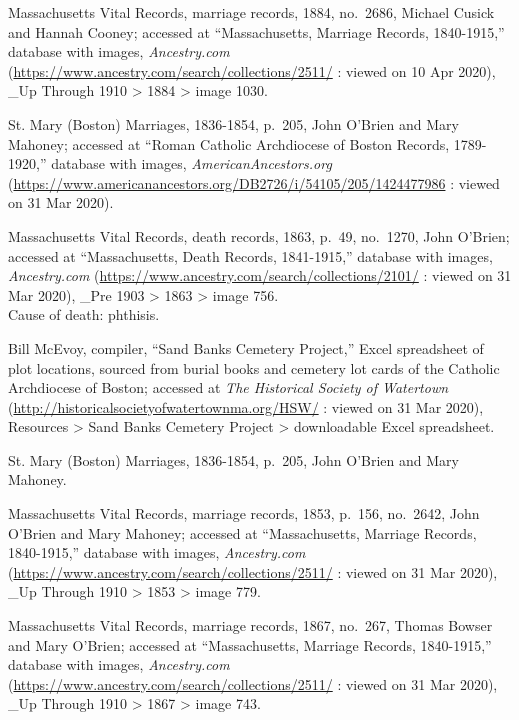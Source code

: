 \begin{thebibliography}{999}
Massachusetts Vital Records, marriage records, 1884, no.\ 2686, Michael Cusick and Hannah Cooney; accessed at ``Massachusetts, Marriage Records, 1840-1915,'' database with images, \textit{Ancestry.com} (\url{https://www.ancestry.com/search/collections/2511/} : viewed on 10 Apr 2020), \_Up Through 1910 > 1884 > image 1030.


St. Mary (Boston) Marriages, 1836-1854, p.\ 205, John O'Brien and Mary Mahoney; accessed at ``Roman Catholic Archdiocese of Boston Records, 1789-1920,'' database with images, \textit{AmericanAncestors.org} (\url{https://www.americanancestors.org/DB2726/i/54105/205/1424477986} : viewed on 31 Mar 2020).

Massachusetts Vital Records, death records, 1863, p.\ 49, no.\ 1270, John O'Brien; accessed at ``Massachusetts, Death Records, 1841-1915,'' database with images, \textit{Ancestry.com} (\url{https://www.ancestry.com/search/collections/2101/} : viewed on 31 Mar 2020), \_Pre 1903 > 1863 > image 756.\\
Cause of death: phthisis.

Bill McEvoy, compiler, ``Sand Banks Cemetery Project,'' Excel spreadsheet of plot locations, sourced from burial books and cemetery lot cards of the Catholic Archdiocese of Boston; accessed at \textit{The Historical Society of Watertown} (\url{http://historicalsocietyofwatertownma.org/HSW/} : viewed on 31 Mar 2020), Resources > Sand Banks Cemetery Project > downloadable Excel spreadsheet.

St. Mary (Boston) Marriages, 1836-1854, p.\ 205, John O'Brien and Mary Mahoney.

Massachusetts Vital Records, marriage records, 1853, p.\ 156, no.\ 2642, John O'Brien and Mary Mahoney; accessed at ``Massachusetts, Marriage Records, 1840-1915,'' database with images, \textit{Ancestry.com} (\url{https://www.ancestry.com/search/collections/2511/} : viewed on 31 Mar 2020), \_Up Through 1910 > 1853 > image 779.

Massachusetts Vital Records, marriage records, 1867, no.\ 267, Thomas Bowser and Mary O'Brien; accessed at ``Massachusetts, Marriage Records, 1840-1915,'' database with images, \textit{Ancestry.com} (\url{https://www.ancestry.com/search/collections/2511/} : viewed on 31 Mar 2020), \_Up Through 1910 > 1867 > image 743.


\end{thebibliography}
